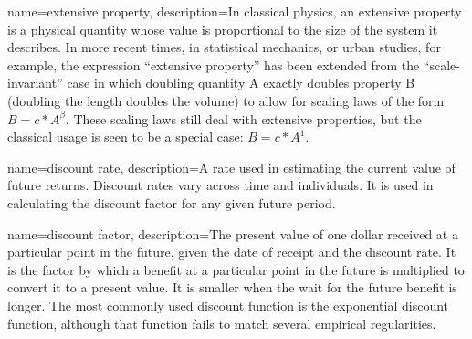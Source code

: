 {
name=extensive property,
description={In classical physics, an extensive property is a physical quantity whose value is proportional to the size of the system it describes. In more recent times, in statistical mechanics, or urban studies, for example, the expression ``extensive property'' has been extended from the ``scale-invariant'' case in which doubling quantity A exactly doubles property B (doubling the length doubles the volume) to allow for scaling laws of the form $B=c*A^\beta$. These \glspl{scaling law} still deal with extensive properties, but the classical usage is seen to be a special case: $B=c*A^1$.}
}

{
name=discount rate,
description={A rate used in estimating the current value of future returns. Discount rates vary across time and individuals. It is used in calculating the \gls{discount factor} for any given future period.}
}



{
name=discount factor,
description={The present value of one dollar received at a particular point in the future, given the date of receipt and the \gls{discount rate}. It is the factor by which a benefit at a particular point in the future is multiplied to convert it to a present value. It is smaller when the wait for the future benefit is longer.  The most commonly used discount function is the exponential discount function, although that function fails to match several empirical regularities.  }
}

